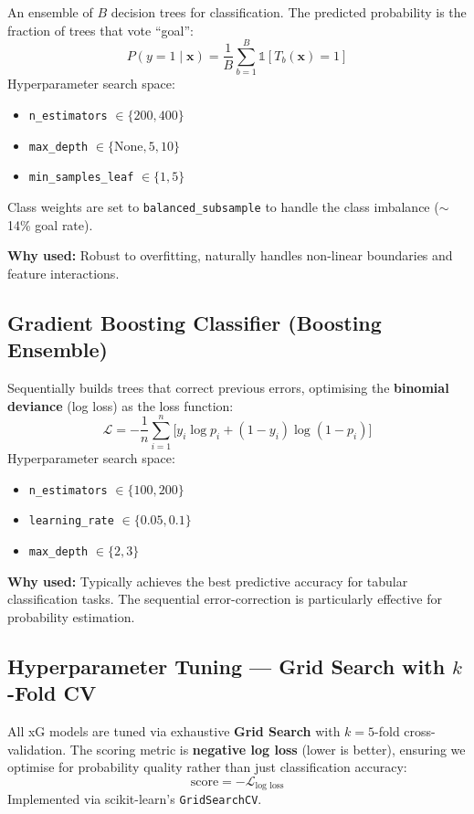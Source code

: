 \documentclass[11pt,a4paper]{article}
\begin{document}
An ensemble of $B$ decision trees for classification.  The predicted
probability is the fraction of trees that vote ``goal'':
\[
  P(y=1 \mid \mathbf{x}) = \frac{1}{B}\sum_{b=1}^{B}
    \mathbb{1}[T_b(\mathbf{x}) = 1]
\]
Hyperparameter search space:
\begin{itemize}[nosep]
  \item \texttt{n\_estimators} $\in \{200, 400\}$
  \item \texttt{max\_depth} $\in \{\text{None}, 5, 10\}$
  \item \texttt{min\_samples\_leaf} $\in \{1, 5\}$
\end{itemize}
Class weights are set to \texttt{balanced\_subsample} to handle the
class imbalance ($\sim$14\% goal rate).

\textbf{Why used:} Robust to overfitting, naturally handles non-linear
boundaries and feature interactions.

\subsection{Gradient Boosting Classifier (Boosting Ensemble)}

Sequentially builds trees that correct previous errors, optimising the
\textbf{binomial deviance} (log loss) as the loss function:
\[
  \mathcal{L} = -\frac{1}{n}\sum_{i=1}^{n}\bigl[
    y_i \log p_i + (1 - y_i)\log(1 - p_i)
  \bigr]
\]
Hyperparameter search space:
\begin{itemize}[nosep]
  \item \texttt{n\_estimators} $\in \{100, 200\}$
  \item \texttt{learning\_rate} $\in \{0.05, 0.1\}$
  \item \texttt{max\_depth} $\in \{2, 3\}$
\end{itemize}

\textbf{Why used:} Typically achieves the best predictive accuracy for
tabular classification tasks.  The sequential error-correction is
particularly effective for probability estimation.

\subsection{Hyperparameter Tuning --- Grid Search with $k$-Fold CV}

All xG models are tuned via exhaustive \textbf{Grid Search} with
$k = 5$-fold cross-validation.  The scoring metric is
\textbf{negative log loss} (lower is better), ensuring we optimise
for probability quality rather than just classification accuracy:
\[
  \text{score} = -\mathcal{L}_{\text{log loss}}
\]
Implemented via scikit-learn's \texttt{GridSearchCV}.
\end{document}
